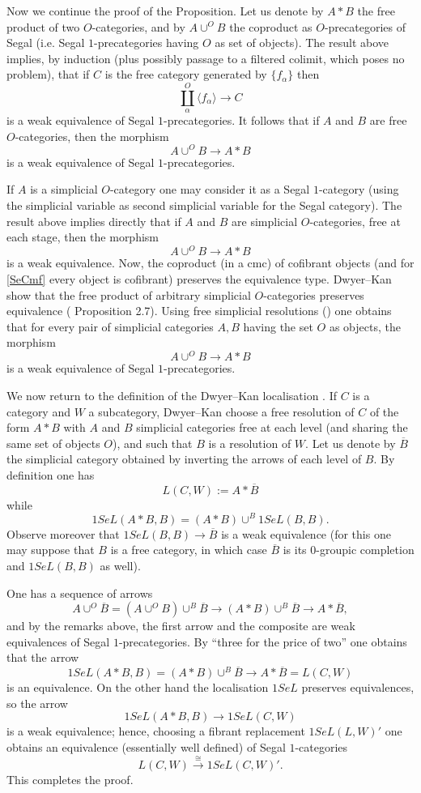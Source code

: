 Now we continue the proof of the Proposition. Let us denote by
$A\ast B$ the free product of two $O$-categories, and by $A\cup ^OB$ the
coproduct as $O$-precategories of Segal (i.e. Segal $1$-precategories having $O$
as set of objects). The result above implies, by
induction (plus
possibly passage to a filtered colimit, which poses no problem), that if $C$
is the free category generated by $\{
f_{\alpha}\}$
then
$$
\coprod _{\alpha}^{O} \langle f_{\alpha} \rangle \rightarrow C
$$
is a weak equivalence of Segal $1$-precategories. It follows that if
$A$ and
$B$ are free $O$-categories, then the morphism
$$
A\cup ^OB\rightarrow A\ast B
$$
is a weak equivalence of Segal $1$-precategories.

If $A$ is a simplicial $O$-category one may consider it as a
Segal $1$-category (using the simplicial variable as second
simplicial variable for the Segal category). The result above
implies directly that if $A$ and $B$ are simplicial $O$-categories,
free at each stage, then the morphism
$$
A\cup ^OB\rightarrow A\ast B
$$
is a weak equivalence. Now, the coproduct (in a cmc) of
cofibrant objects (and for \ref{SeCmf} every object is cofibrant)
preserves the equivalence type. Dwyer--Kan show that the free product of
arbitrary simplicial
$O$-categories preserves equivalence
(\cite{DwyerKan1} Proposition 2.7). Using free simplicial
resolutions (\cite{DwyerKan1}) one obtains that for every pair of simplicial
categories $A,B$ having the set $O$ as objects,
the morphism
$$
A\cup ^OB\rightarrow A\ast B
$$
is a weak equivalence of Segal $1$-precategories.

We now return to the definition of the Dwyer--Kan localisation
\cite{DwyerKan1}. If $C$ is a category and $W$ a subcategory,
Dwyer--Kan choose a free resolution of $C$ of the form
$A\ast B$ with $A$ and $B$ simplicial categories free at
each level
(and sharing the same set of objects $O$),
and such that $B$ is a resolution of $W$. Let us denote by $\overline{B}$
the simplicial category obtained by inverting the arrows of each level
of $B$. By definition one has
$$
L(C,W):= A\ast \overline{B}
$$
while
$$
1SeL(A\ast B, B)= (A\ast B)\cup ^{B}1SeL(B,B).
$$
Observe moreover that $1SeL(B,B)\rightarrow \overline{B}$ is a weak
equivalence (for this one may suppose that $B$ is a free category, in which
case
$\overline{B}$ is its $0$-groupic completion and $1SeL(B,B)$ as well).

One
has a sequence of arrows $$
A\cup ^O \overline{B} = (A\cup ^OB)\cup ^B\overline{B}\rightarrow
(A\ast B)\cup ^{B}\overline{B}\rightarrow A\ast \overline{B},
$$
and by the remarks above,
the first arrow and the composite are
weak equivalences of Segal $1$-precategories. By
``three for the price of
two'' one obtains that the arrow
$$
1SeL(A\ast B, B)= (A\ast B)\cup ^{B}\overline{B}\rightarrow A\ast
\overline{B}=L(C,W)
$$
is an equivalence. On the other hand the localisation $1SeL$
preserves equivalences, so the arrow
$$
1SeL(A\ast B, B)\rightarrow 1SeL(C,W)
$$
is a weak equivalence; hence, choosing a fibrant replacement
$1SeL(L,W)'$ %
one obtains an equivalence (essentially well defined)
of Segal $1$-categories
$$
L(C,W)\stackrel{\cong}{\rightarrow} 1SeL(C,W)'.
$$
This completes the proof.
\eop


